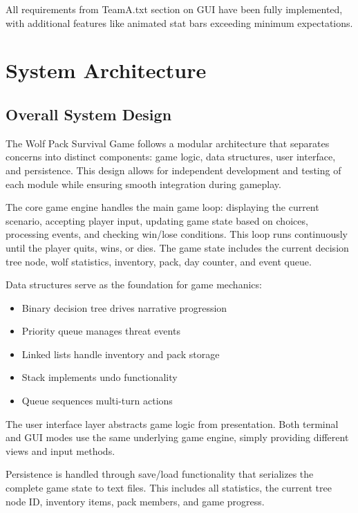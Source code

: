 \documentclass[12pt,a4paper]{article}
\begin{document}
\vspace{0.3cm}

All requirements from TeamA.txt section on GUI have been fully implemented, with additional features like animated stat bars exceeding minimum expectations.

\newpage

\section{System Architecture}

\subsection{Overall System Design}
The Wolf Pack Survival Game follows a modular architecture that separates concerns into distinct components: game logic, data structures, user interface, and persistence. This design allows for independent development and testing of each module while ensuring smooth integration during gameplay.

The core game engine handles the main game loop: displaying the current scenario, accepting player input, updating game state based on choices, processing events, and checking win/lose conditions. This loop runs continuously until the player quits, wins, or dies. The game state includes the current decision tree node, wolf statistics, inventory, pack, day counter, and event queue.

Data structures serve as the foundation for game mechanics:
\begin{itemize}
	\item Binary decision tree drives narrative progression
	\item Priority queue manages threat events
	\item Linked lists handle inventory and pack storage
	\item Stack implements undo functionality
	\item Queue sequences multi-turn actions
\end{itemize}

The user interface layer abstracts game logic from presentation. Both terminal and GUI modes use the same underlying game engine, simply providing different views and input methods.

Persistence is handled through save/load functionality that serializes the complete game state to text files. This includes all statistics, the current tree node ID, inventory items, pack members, and game progress.
\end{document}
